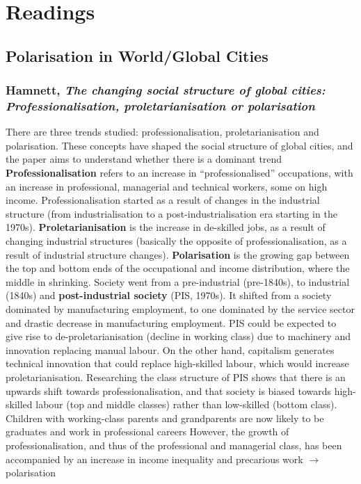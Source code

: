 \documentclass{article}
\begin{document}
\section{Readings}

\subsection{Polarisation in World/Global Cities}

\subsubsection{Hamnett, \textit{The changing social structure of global cities: Professionalisation, proletarianisation or polarisation}}

\begin{outline}
	\1 There are three trends studied: professionalisation, proletarianisation and polarisation. These concepts have shaped the social structure of global cities, and the paper aims to understand whether there is a dominant trend
	\1 \textbf{Professionalisation} refers to an increase in ``professionalised'' occupations, with an increase in professional, managerial and technical workers, some on high income. Professionalisation started as a result of changes in the industrial structure (from industrialisation to a post-industrialisation era starting in the 1970s).
	\1 \textbf{Proletarianisation} is the increase in de-skilled jobs, as a result of changing industrial structures (basically the opposite of professionalisation, as a result of industrial structure changes).
	\1 \textbf{Polarisation} is the growing gap between the top and bottom ends of the occupational and income distribution, where the middle in shrinking.
	\1 Society went from a pre-industrial (pre-1840s), to industrial (1840s) and \textbf{post-industrial society} (PIS, 1970s). 
		\2 It shifted from a society dominated by manufacturing employment, to one dominated by the service sector and drastic decrease in manufacturing employment. PIS could be expected to give rise to de-proletarianisation (decline in working class) due to machinery and innovation replacing manual labour. On the other hand, capitalism generates technical innovation that could replace high-skilled labour, which would increase proletarianisation.
		\2 Researching the class structure of PIS shows that there is an upwards shift towards professionalisation, and that society is biased towards high-skilled labour (top and middle classes) rather than low-skilled (bottom class). Children with working-class parents and grandparents are now likely to be graduates and work in professional careers
		\2 However, the growth of professionalisation, and thus of the professional and managerial class, has been accompanied by an increase in income inequality and precarious work $\rightarrow$ polarisation
 \end{outline}
\end{document}
